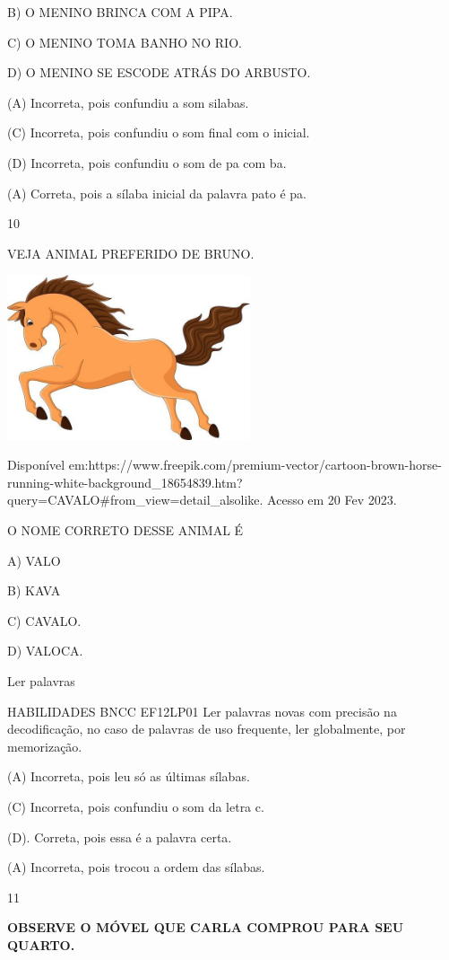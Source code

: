 \begin{escola}
{{{{{{{{{{{{{{{{{{{B) O MENINO BRINCA COM A PIPA.

C) O MENINO TOMA BANHO NO RIO.

D) O MENINO SE ESCODE ATRÁS DO ARBUSTO.

(A) Incorreta, pois confundiu a som silabas.

(C) Incorreta, pois confundiu o som final com o inicial.

(D) Incorreta, pois confundiu o som de pa com ba.

(A) Correta, pois a sílaba inicial da palavra pato é
pa.\protect\hypertarget{_heading=h.qmyrjsh4y5fg}{}{}

\num{10}

VEJA ANIMAL PREFERIDO DE BRUNO.

\includegraphics[width=2.82210in,height=1.90975in]{media/image234.jpg}

Disponível
em:https://www.freepik.com/premium-vector/cartoon-brown-horse-running-white-background\_18654839.htm?query=CAVALO\#from\_view=detail\_alsolike.
Acesso em 20 Fev 2023.

O NOME CORRETO DESSE ANIMAL É

A) VALO

B) KAVA

C) CAVALO.

D) VALOCA.

Ler palavras

HABILIDADES BNCC EF12LP01 Ler palavras novas com precisão na
decodificação, no caso de palavras de uso frequente, ler globalmente,
por memorização.

(A) Incorreta, pois leu só as últimas sílabas.

(C) Incorreta, pois confundiu o som da letra c.

(D). Correta, pois essa é a palavra certa.

(A) Incorreta, pois trocou a ordem das
sílabas.\protect\hypertarget{_heading=h.oxa1c0ljwovb}{}{}

\num{11}

\textbf{OBSERVE O MÓVEL QUE CARLA COMPROU PARA SEU QUARTO.}

}}}}}}}}}}}}}}}}}}}
\end{escola}
